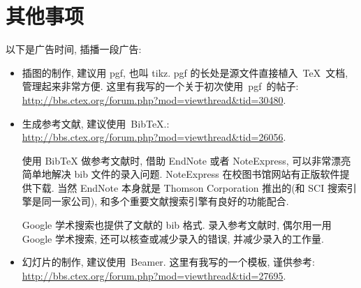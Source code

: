 \chapter{其他事项}
以下是广告时间, 插播一段广告:
\begin{itemize}
    \item 插图的制作, 建议用 pgf, 也叫 tikz.
          pgf 的长处是源文件直接植入~\TeX~文档, 管理起来非常方便.
    这里有我写的一个关于初次使用~pgf~的帖子:\\    \url{http://bbs.ctex.org/forum.php?mod=viewthread&tid=30480}.
    \item 生成参考文献, 建议使用~BibTeX.: \\
    \url{http://bbs.ctex.org/forum.php?mod=viewthread&tid=26056}.

          {\kaishu 使用 BibTeX{} 做参考文献时,
      借助 EndNote 或者 NoteExpress, 可以非常漂亮简单地解决 bib 文件的录入问题.
      NoteExpress 在校图书馆网站有正版软件提供下载.
      当然 EndNote 本身就是 Thomson Corporation 推出的(和 SCI 搜索引擎是同一家公司),
      和多个重要文献搜索引擎有良好的功能配合.

      Google 学术搜索也提供了文献的 bib 格式.
      录入参考文献时, 偶尔用一用 Google 学术搜索, 还可以核查或减少录入的错误, 并减少录入的工作量.}

    \item 幻灯片的制作, 建议使用~Beamer. 这里有我写的一个模板, 谨供参考:\\
    \url{http://bbs.ctex.org/forum.php?mod=viewthread&tid=27695}.
\end{itemize}